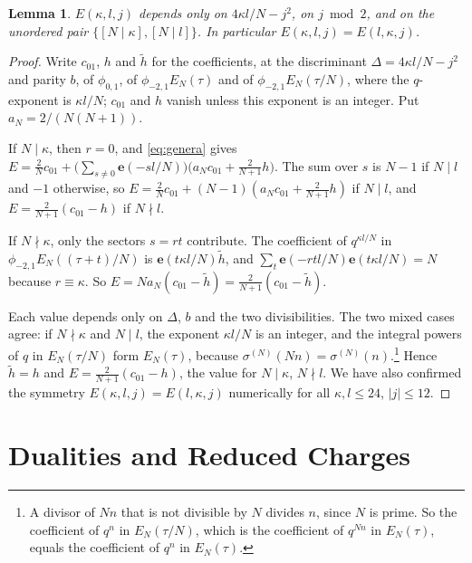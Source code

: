 \documentclass[11pt]{amsart}
\numberwithin{equation}{section}
\theoremstyle{plain}
\newtheorem{lem}[thm]{Lemma}
\theoremstyle{definition}
\theoremstyle{remark}
\newcommand{\e}{\mathbf{e}}
\newcommand{\pmi}{\phi_{-2,1}}
\newcommand{\pz}{\phi_{0,1}}
\begin{document}
\begin{lem}\label{lem:E}
$E(\kappa,l,j)$ depends only on $4\kappa l/N-j^2$, on $j\bmod 2$, and on the unordered pair $\{[N\mid\kappa],[N\mid l]\}$. In particular $E(\kappa,l,j)=E(l,\kappa,j)$.
\end{lem}

\begin{proof}
Write $c_{01}$, $h$ and $\tilde h$ for the coefficients, at the discriminant $\Delta=4\kappa l/N-j^2$ and parity $b$, of $\pz$, of $\pmi E_N(\tau)$ and of $\pmi E_N(\tau/N)$, where the $q$-exponent is $\kappa l/N$; $c_{01}$ and $h$ vanish unless this exponent is an integer. Put $a_N=2/(N(N+1))$.

If $N\mid\kappa$, then $r=0$, and \eqref{eq:genera} gives $E=\frac2Nc_{01}+\bigl(\sum_{s\ne0}\e(-sl/N)\bigr)\bigl(a_Nc_{01}+\frac{2}{N+1}h\bigr)$. The sum over $s$ is $N-1$ if $N\mid l$ and $-1$ otherwise, so $E=\frac2Nc_{01}+(N-1)(a_Nc_{01}+\frac2{N+1}h)$ if $N\mid l$, and $E=\frac{2}{N+1}(c_{01}-h)$ if $N\nmid l$.

If $N\nmid\kappa$, only the sectors $s=rt$ contribute. The coefficient of $q^{\kappa l/N}$ in $\pmi E_N((\tau+t)/N)$ is $\e(t\kappa l/N)\tilde h$, and $\sum_t\e(-rtl/N)\e(t\kappa l/N)=N$ because $r\equiv\kappa$. So $E=N a_N(c_{01}-\tilde h)=\frac{2}{N+1}(c_{01}-\tilde h)$.

Each value depends only on $\Delta$, $b$ and the two divisibilities. The two mixed cases agree: if $N\nmid\kappa$ and $N\mid l$, the exponent $\kappa l/N$ is an integer, and the integral powers of $q$ in $E_N(\tau/N)$ form $E_N(\tau)$, because $\sigma^{(N)}(Nn)=\sigma^{(N)}(n)$.\footnote{A divisor of $Nn$ that is not divisible by $N$ divides $n$, since $N$ is prime. So the coefficient of $q^{n}$ in $E_N(\tau/N)$, which is the coefficient of $q^{Nn}$ in $E_N(\tau)$, equals the coefficient of $q^n$ in $E_N(\tau)$.} Hence $\tilde h=h$ and $E=\frac{2}{N+1}(c_{01}-h)$, the value for $N\mid\kappa$, $N\nmid l$. We have also confirmed the symmetry $E(\kappa,l,j)=E(l,\kappa,j)$ numerically for all $\kappa,l\le24$, $|j|\le12$.
\end{proof}

\section{Dualities and Reduced Charges}\label{sec:red}
\end{document}
